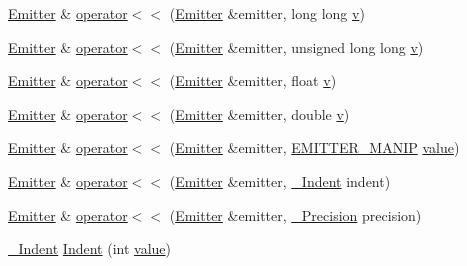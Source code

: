 \begin{DoxyCompactItemize}
\item 
\mbox{\hyperlink{class_y_a_m_l_1_1_emitter}{Emitter}} \& \mbox{\hyperlink{namespace_y_a_m_l_a978907c257b4ab1d882d6d6b920f4389}{operator$<$$<$}} (\mbox{\hyperlink{class_y_a_m_l_1_1_emitter}{Emitter}} \&emitter, long long \mbox{\hyperlink{glad_8h_a14cfbe2fc2234f5504618905b69d1e06}{v}})
\item 
\mbox{\hyperlink{class_y_a_m_l_1_1_emitter}{Emitter}} \& \mbox{\hyperlink{namespace_y_a_m_l_a3e9d3b0d71926ec315268554be89062a}{operator$<$$<$}} (\mbox{\hyperlink{class_y_a_m_l_1_1_emitter}{Emitter}} \&emitter, unsigned long long \mbox{\hyperlink{glad_8h_a14cfbe2fc2234f5504618905b69d1e06}{v}})
\item 
\mbox{\hyperlink{class_y_a_m_l_1_1_emitter}{Emitter}} \& \mbox{\hyperlink{namespace_y_a_m_l_ac08f8bce087727d2391bf58cefba2efb}{operator$<$$<$}} (\mbox{\hyperlink{class_y_a_m_l_1_1_emitter}{Emitter}} \&emitter, float \mbox{\hyperlink{glad_8h_a14cfbe2fc2234f5504618905b69d1e06}{v}})
\item 
\mbox{\hyperlink{class_y_a_m_l_1_1_emitter}{Emitter}} \& \mbox{\hyperlink{namespace_y_a_m_l_a1c198c408cbcbeec037650eedb55b1d7}{operator$<$$<$}} (\mbox{\hyperlink{class_y_a_m_l_1_1_emitter}{Emitter}} \&emitter, double \mbox{\hyperlink{glad_8h_a14cfbe2fc2234f5504618905b69d1e06}{v}})
\item 
\mbox{\hyperlink{class_y_a_m_l_1_1_emitter}{Emitter}} \& \mbox{\hyperlink{namespace_y_a_m_l_ac07c6e8ecab18eed882c4a626e3248de}{operator$<$$<$}} (\mbox{\hyperlink{class_y_a_m_l_1_1_emitter}{Emitter}} \&emitter, \mbox{\hyperlink{namespace_y_a_m_l_a67c320aa50d3de7ecba1d0b8775dd684}{E\+M\+I\+T\+T\+E\+R\+\_\+\+M\+A\+N\+IP}} \mbox{\hyperlink{glad_8h_a03aff08f73d7fde3d1a08e0abd8e84fa}{value}})
\item 
\mbox{\hyperlink{class_y_a_m_l_1_1_emitter}{Emitter}} \& \mbox{\hyperlink{namespace_y_a_m_l_a33ba2d3ca38db7def99e111d150aa134}{operator$<$$<$}} (\mbox{\hyperlink{class_y_a_m_l_1_1_emitter}{Emitter}} \&emitter, \mbox{\hyperlink{struct_y_a_m_l_1_1___indent}{\+\_\+\+Indent}} indent)
\item 
\mbox{\hyperlink{class_y_a_m_l_1_1_emitter}{Emitter}} \& \mbox{\hyperlink{namespace_y_a_m_l_ab2d3cbd50dde933e752f6bee2e45f088}{operator$<$$<$}} (\mbox{\hyperlink{class_y_a_m_l_1_1_emitter}{Emitter}} \&emitter, \mbox{\hyperlink{struct_y_a_m_l_1_1___precision}{\+\_\+\+Precision}} precision)
\item 
\mbox{\hyperlink{struct_y_a_m_l_1_1___indent}{\+\_\+\+Indent}} \mbox{\hyperlink{namespace_y_a_m_l_aac525b330f69de8ded003d068b2f6f3a}{Indent}} (int \mbox{\hyperlink{glad_8h_a03aff08f73d7fde3d1a08e0abd8e84fa}{value}})

\end{DoxyCompactItemize}
